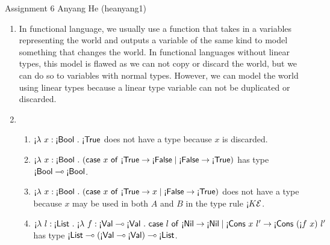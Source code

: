 \documentclass[11pt]{article}
\newcommand{\lfun}[3]{\text{\textexclamdown}\lambda~{#1}:{#2}~.~{#3}}
\newcommand{\lapp}[2]{\text{\textexclamdown}{#1}~{#2}}
\newcommand{\lcase}[2]{\mathsf{case}~{#1}~\mathsf{of}~{#2}}
\newcommand{\ltyprim}[1]{\text{\textexclamdown}\msf{#1}}
\newcommand{\ltyfun}[2]{{#1} \multimap {#2}}
\begin{document}
\hwtitle
  {Assignment 6}
  {Anyang He (heanyang1)} %


\begin{enumerate}
\item In functional language, we usually use a function that takes in a variables representing the world and outputs a variable of the same kind to model something that changes the world. In functional languages without linear types, this model is flawed as we can not copy or discard the world, but we can do so to variables with normal types. However, we can model the world using linear types because a linear type variable can not be duplicated or discarded.

\item
  \begin{enumerate} %
    \item \(\lfun{x}{\ltyprim{Bool}}{\ltyprim{True}}\) does not have a type because \(x\) is discarded.
    \item \(\lfun {x}{\ltyprim{Bool}}{(\lcase{x}{\ltyprim{True} \rightarrow \ltyprim{False} \mid \ltyprim{False} \rightarrow \ltyprim{True}})}\) has type \(\ltyfun{\ltyprim{Bool}}{\ltyprim{Bool}}\).
    \item \(\lfun {x}{\ltyprim{Bool}}{(\lcase{x}{\ltyprim{True} \rightarrow x \mid \ltyprim{False} \rightarrow \ltyprim{True}})}\) does not have a type because \(x\) may be used in both \(A\) and \(B\) in the type rule \(\ltyprim{}K\mathcal{E}\).
    \item \(\lfun{l}{\ltyprim{List}}{
      \lfun{f}{\ltyfun{\ltyprim{Val}}{\ltyprim{Val}}}
      {\lcase{l}{\ltyprim{Nil} \rightarrow \ltyprim{Nil} \mid \ltyprim{Cons}~x~l' \rightarrow \ltyprim{Cons}~(\lapp{f}{x})~l'}}}\) has type \(\ltyfun{\ltyprim{List}}{}(\ltyfun{\ltyprim{Val}}{\ltyprim{Val}})\ltyfun{}{\ltyprim{List}}\).
  \end{enumerate}
\end{enumerate}
\end{document}
